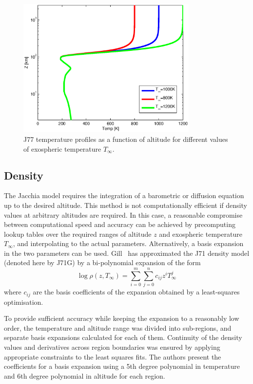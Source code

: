 \documentclass[a4paper]{article}
\begin{document}
\begin{figure}
\includegraphics[width=0.8\textwidth]{jacchia_temp.eps}
\caption{J77 temperature profiles as a function of altitude for different values of exospheric temperature $T_\infty$.}
\label{fig:jacchia_temp}
\end{figure}

\subsection{Density}

The Jacchia model requires the integration of a barometric or diffusion equation up to the desired altitude. This method is not computationally efficient if density values at arbitrary altitudes are required. In this case, a reasonable compromise between computational speed and accuracy can be achieved by precomputing lookup tables over the required ranges of altitude $z$ and exospheric temperature $T_\infty$, and interpolating to the actual parameters. Alternatively, a basis expansion in the two parameters can be used. Gill~\cite{gill96} has approximated the J71 density model (denoted here by J71G) by a bi-polynomial expansion of the form
\begin{equation}\label{eq:interpol}
\log \rho(z,T_\infty) = \sum_{i=0}^m \sum_{j=0}^n c_{ij} z^i T_\infty^j
\end{equation}
where $c_{ij}$ are the basis coefficients of the expansion obtained by a least-squares optimisation.

To provide sufficient accuracy while keeping the expansion to a reasonably low order, the temperature and altitude range was divided into sub-regions, and separate basis expansions calculated for each of them. Continuity of the density values and derivatives across region boundaries was ensured by applying appropriate constraints to the least squares fits. The authors present the coefficients for a basis expansion using a 5th degree polynomial in temperature and 6th degree polynomial in altitude for each region.
\end{document}
